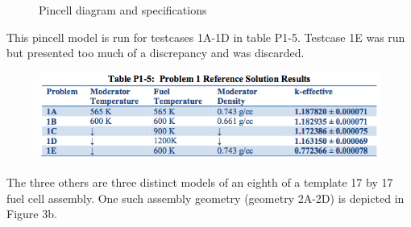 \documentclass[12pt]{article}
\begin{document}
\begin{figure}[h]
\centering
{}
\hspace{0.01cm}
\caption{Pincell diagram and specifications}
\label{fig:subassemandkey}
\end{figure}

This pincell model is run for testcases 1A-1D in table P1-5. Testcase 1E was run but presented too much of a discrepancy and was discarded.

\begin{figure} [htb!]
\centering
\includegraphics[scale=0.7]{Figures/CASL P1 resultsTable.png}
\end{figure}

 The three others are three distinct models of an eighth of a template 17 by 17 fuel cell assembly. One such assembly geometry (geometry 2A-2D) is depicted in Figure 3b. 
 
\end{document}
